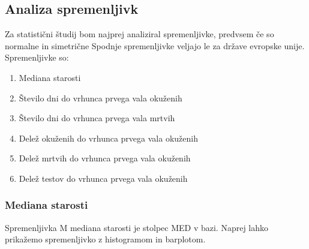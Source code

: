 \documentclass[a4paper,11pt]{article}
\begin{document}
\subsection{Analiza spremenljivk}
Za statistični študij bom najprej analiziral spremenljivke, predvsem če so normalne in simetrične Spodnje spremenljivke veljajo le za države evropske unije. Spremenljivke so:
\begin{enumerate}
\item{Mediana starosti}
\item{Število dni do vrhunca prvega vala okuženih}
\item{Število dni do vrhunca prvega vala mrtvih}
\item{Delež okuženih do vrhunca prvega vala okuženih}
\item{Delež mrtvih do vrhunca prvega vala okuženih}
\item{Delež testov do vrhunca prvega vala okuženih}
\end{enumerate}

\subsubsection{Mediana starosti}
Spremenljivka M mediana starosti je stolpec MED v bazi. Naprej lahko prikažemo spremenljivko z histogramom in barplotom.
\end{document}
